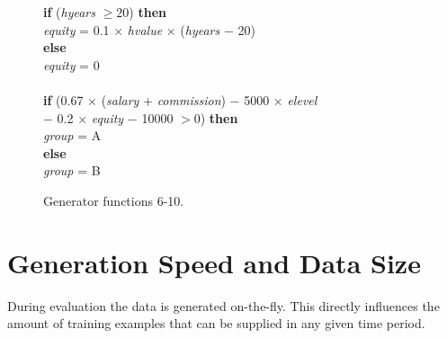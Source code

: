 \begin{figure}
\begin{enumerate}
{\bf if} ({\it hyears} $\ge 20$) {\bf then}\\
\hspace*{1em} {\it equity} = 0.1 $\times$ {\it hvalue} $\times$ ({\it hyears} $-$ 20)\\
{\bf else}\\
\hspace*{1em} {\it equity} = 0\\
\\
{\bf if} (0.67 $\times$ ({\it salary} + {\it commission}) $-$ 5000 $\times$ {\it elevel}\\
\hspace*{1em} $-$ 0.2 $\times$ {\it equity} $-$ 10000 $> 0$) {\bf then}\\
\hspace*{1em} {\it group} = A\\
{\bf else}\\
\hspace*{1em} {\it group} = B\\
\end{enumerate}
\caption{Generator functions 6-10.}
\label{fig:agrawalFuncs2}
\end{figure}

\section{Generation Speed and Data Size}
\label{sec:genspeed}

During evaluation the data is generated on-the-fly. This directly influences the amount of training examples that can be supplied in any given time period.

